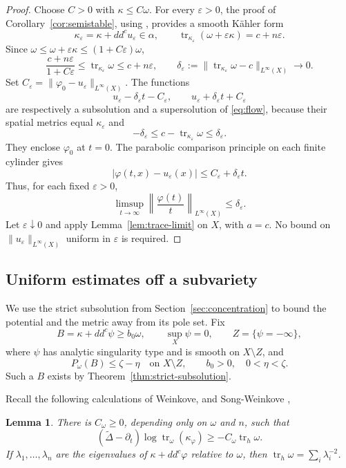 \documentclass[reqno]{amsart}
\numberwithin{equation}{section}
\newtheorem{lemma}[theorem]{Lemma}
\theoremstyle{definition}
\DeclareMathOperator{\tr}{tr}
\newcommand{\ddc}{dd^c}
\begin{document}
\begin{proof}
Choose $C>0$ with $\kappa\le C\omega$. For every $\varepsilon>0$,
the proof of Corollary~\ref{cor:semistable}, using
\cite[Corollary~1.2]{S20}, provides a smooth K\"ahler form
\[
 \kappa_\varepsilon=\kappa+\ddc u_\varepsilon\in\alpha,
 \qquad
 \tr_{\kappa_\varepsilon}(\omega+\varepsilon\kappa)=c+n\varepsilon.
\]
Since $\omega\le\omega+\varepsilon\kappa\le(1+C\varepsilon)\omega$,
\[
 \frac{c+n\varepsilon}{1+C\varepsilon}
 \le\tr_{\kappa_\varepsilon}\omega\le c+n\varepsilon,
 \qquad
 \delta_\varepsilon
 :=\|\tr_{\kappa_\varepsilon}\omega-c\|_{L^\infty(X)}
 \longrightarrow0.
\]
Set $C_\varepsilon=\|\varphi_0-u_\varepsilon\|_{L^\infty(X)}$.
The functions
\[
 u_\varepsilon-\delta_\varepsilon t-C_\varepsilon,
 \qquad
 u_\varepsilon+\delta_\varepsilon t+C_\varepsilon
\]
are respectively a subsolution and a supersolution of
\eqref{eq:flow}, because their spatial metrics equal $\kappa_\varepsilon$
and
\[
 -\delta_\varepsilon
 \le c-\tr_{\kappa_\varepsilon}\omega\le\delta_\varepsilon.
\]
They enclose $\varphi_0$ at $t=0$. The parabolic comparison principle
on each finite cylinder gives
\[
 |\varphi(t,x)-u_\varepsilon(x)|
 \le C_\varepsilon+\delta_\varepsilon t.
\]
Thus, for each fixed $\varepsilon>0$,
\[
 \limsup_{t\to\infty}
 \left\|\frac{\varphi(t)}t\right\|_{L^\infty(X)}
 \le\delta_\varepsilon.
\]
Let $\varepsilon\downarrow0$ and apply
Lemma~\ref{lem:trace-limit} on $X$, with $a=c$.
No bound on $\|u_\varepsilon\|_{L^\infty(X)}$ uniform in
$\varepsilon$ is required.
\end{proof}
\subsection{Uniform estimates off a subvariety}
We use the strict subsolution from Section~\ref{sec:concentration} to
bound the potential and the metric away from its pole set. Fix
\[
 B=\kappa+\ddc\psi\ge b_0\omega,\qquad
 \sup_X\psi=0,\qquad Z=\{\psi=-\infty\},
\]
where $\psi$ has analytic singularity type and is smooth on
$X\setminus Z$, and
\begin{equation}\label{eq:flow-barrier}
 P_\omega(B)\le\zeta-\eta\quad\text{on }X\setminus Z,
 \qquad b_0>0,\quad 0<\eta<\zeta.
\end{equation}
Such a $B$ exists by Theorem~\ref{thm:strict-subsolution}.

Recall the following calculations of Weinkove, and Song-Weinkove \cite{W06,SW08}, \begin{lemma}\label{lem:flow-trace}
There is $C_\omega\ge0$, depending only on $\omega$ and $n$, such that
\begin{equation}\label{eq:flow-trace}
 (\widetilde\Delta-\partial_t)
       \log\tr_\omega(\kappa_\varphi)
 \ge-C_\omega\tr_h\omega.
\end{equation}
If $\lambda_1,\ldots,\lambda_n$ are the eigenvalues of
$\kappa+\ddc\varphi$ relative to $\omega$, then
$\tr_h\omega=\sum_i\lambda_i^{-2}$.
\end{lemma}
\end{document}
